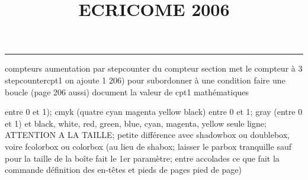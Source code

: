 \documentclass[11pt]{article}%
\title{\bf \vspace{-2cm} ECRICOME 2006} %
\author{} %
\date{} %
\renewcommand{\headrulewidth}{0pt}%
\renewcommand{\footrulewidth}{0.4pt}%
\begin{document}
\maketitle %
\vspace{-1.4cm}\hrule %
\thispagestyle{fancy}

\vspace*{.2cm}



compteurs%
aumentation par stepcounter du compteur section%
met le compteur à 3%
stepcounter{cpt1} on ajoute 1%
206) pour subordonner à une condition %
faire une boucle (page 206 aussi) %
document la valeur de cpt1 
mathématiques\newcommand{\ch}{\operatorname{ch}} 
\newcommand{\sh}{\operatorname{sh}}
\renewcommand{\tanh}{\operatorname{th}}
\renewcommand{\sinh}{\operatorname{sh}}
\renewcommand{\cosh}{\operatorname{ch}}
\newcommand{\argsh}{\operatorname{argsh}}
\newcommand{\argch}{\operatorname{argch}}
\newcommand{\argth}{\operatorname{argth}}
\newcommand{\Id}{\operatorname{Id}}
\renewcommand{\leq}{\leq}
\renewcommand{\geq}{\geq }

\newcommand{\dlim}{\lim}
\newcommand{\dsum}{\sum}
\newcommand{\dint}{\int}
\newcommand{\dprod}{\prod}



entre 0 et 1); cmyk (quatre cyan magenta yellow black) entre 0 et 1;
gray (entre 0 et 1) et black, white, red, green, blue, cyan, magenta,
yellow%
seule ligne; ATTENTION A LA TAILLE; petite différence avec shadowbox ou
doublebox, voire fcolorbox ou colorbox (au lieu de shabox; laisser le
parbox tranquille sauf pour la taille de la boîte
\newcommand{\Tbox}[1]{\begin{center} \shabox{\parbox{0.6
\linewidth}{#1}} \end{center}} %
fait le 1er paramètre; entre accolades ce que fait la commande
définition des en-têtes et pieds de pages\pagestyle{fancy}
\chead{}
\rfoot[ \ \thepage]{\thepage}
\cfoot{}
\lfoot{}
\thispagestyle{fancy} %
pied de page)\renewcommand{\footrulewidth}{0.4pt}
\renewcommand{\headrulewidth}{0.4pt}
\end{document}
